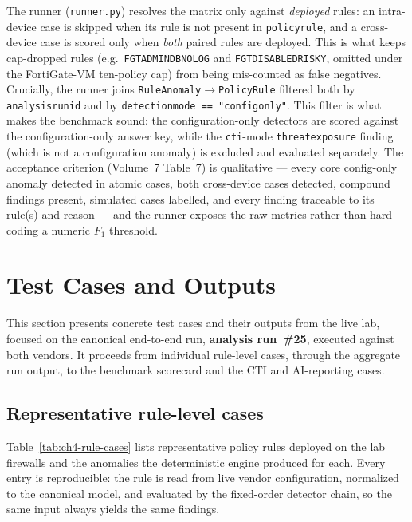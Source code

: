 \documentclass[12pt,a4paper]{report}
\renewcommand{\_}{\textunderscore\allowbreak}
\begin{document}
The runner (\texttt{runner.py}) resolves the matrix only against \emph{deployed} rules: an intra-device case is skipped when its rule is not present in \texttt{policy\_rule}, and a cross-device case is scored only when \emph{both} paired rules are deployed. This is what keeps cap-dropped rules (e.g.\ \texttt{FGT\_ADMIN\_DB\_NOLOG} and \texttt{FGT\_DISABLED\_RISKY}, omitted under the FortiGate-VM ten-policy cap) from being mis-counted as false negatives. Crucially, the runner joins \texttt{RuleAnomaly}$\rightarrow$\texttt{PolicyRule} filtered both by \texttt{analysis\_run\_id} and by \texttt{detection\_mode == "config\_only"}. This filter is what makes the benchmark sound: the configuration-only detectors are scored against the configuration-only answer key, while the \texttt{cti}-mode \texttt{threat\_exposure} finding (which is not a configuration anomaly) is excluded and evaluated separately. The acceptance criterion (Volume~7 Table~7) is qualitative --- every core config-only anomaly detected in atomic cases, both cross-device cases detected, compound findings present, simulated cases labelled, and every finding traceable to its rule(s) and reason --- and the runner exposes the raw metrics rather than hard-coding a numeric $F_1$ threshold.

\section{Test Cases and Outputs}
\label{sec:ch4-test-cases}

This section presents concrete test cases and their outputs from the live lab, focused on the canonical end-to-end run, \textbf{analysis run~\#25}, executed against both vendors. It proceeds from individual rule-level cases, through the aggregate run output, to the benchmark scorecard and the CTI and AI-reporting cases.

\subsection{Representative rule-level cases}

Table~\ref{tab:ch4-rule-cases} lists representative policy rules deployed on the lab firewalls and the anomalies the deterministic engine produced for each. Every entry is reproducible: the rule is read from live vendor configuration, normalized to the canonical model, and evaluated by the fixed-order detector chain, so the same input always yields the same findings.
\end{document}
